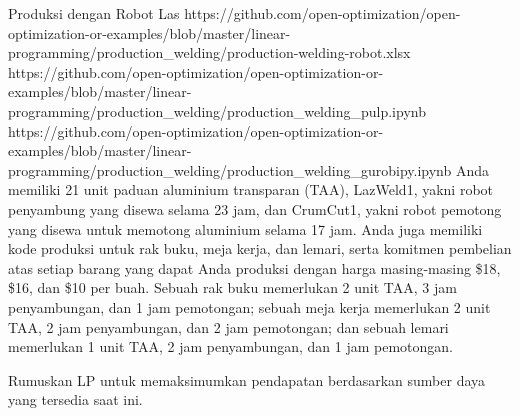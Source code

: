\begin{examplewithallcode}{Produksi dengan Robot Las}
{https://github.com/open-optimization/open-optimization-or-examples/blob/master/linear-programming/production_welding/production-welding-robot.xlsx}
{https://github.com/open-optimization/open-optimization-or-examples/blob/master/linear-programming/production_welding/production_welding_pulp.ipynb}
{https://github.com/open-optimization/open-optimization-or-examples/blob/master/linear-programming/production_welding/production_welding_gurobipy.ipynb}
\label{example:welding-robot}
Anda memiliki 21 unit paduan aluminium transparan (TAA), LazWeld1, yakni robot penyambung yang disewa selama 23 jam, dan CrumCut1, yakni robot pemotong yang disewa untuk memotong aluminium selama 17 jam. Anda juga memiliki kode produksi untuk rak buku, meja kerja, dan lemari, serta komitmen pembelian atas setiap barang yang dapat Anda produksi dengan harga masing-masing \$18, \$16, dan \$10 per buah. Sebuah rak buku memerlukan 2 unit TAA, 3 jam penyambungan, dan 1 jam pemotongan; sebuah meja kerja memerlukan 2 unit TAA, 2 jam penyambungan, dan 2 jam pemotongan; dan sebuah lemari memerlukan 1 unit TAA, 2 jam penyambungan, dan 1 jam pemotongan.

Rumuskan LP untuk memaksimumkan pendapatan berdasarkan sumber daya yang tersedia saat ini.
\end{examplewithallcode}


